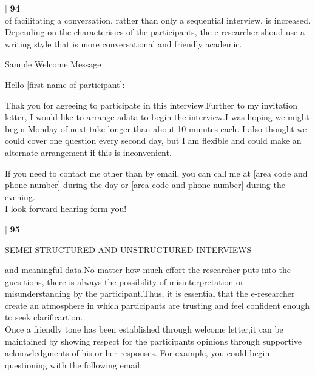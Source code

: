 \documentclass[a4paper]{beamer}
\begin{document}
\begin{frame}
\hspace*{0.1cm}\textbf{$|$}
\hspace*{0.1cm}\textbf{94}\\
of facilitating a conversation, rather than only a sequential interview, is increased. Depending on the characterisics of the participants, the e-researcher shoud use a writing style that is more conversational and friendly academic.
\begin{center}

Sample Welcome Message

\end{center}
Hello [first name of participant]:

 \vspace*{5mm}
 Thak you for agreeing to participate in this interview.Further to my invitation letter, I would like to arrange adata to begin the interview.I was hoping we might begin Monday of next take longer than about 10 minutes each. I also thought we could cover one question every second day, but I am flexible and could make an alternate arrangement if this is inconvenient.
 
 \vspace{5mm}
 If you need to contact me other than by email, you can call me at [area code and phone number] during the day or [area code and phone number] during the evening.\\
 I look forward hearing form you!
\end{frame}
\begin{frame}
\hspace*{0.1cm}\textbf{$|$}
\hspace*{0.1cm}\textbf{95}\\ 
\begin{flushright}
SEMEI-STRUCTURED AND UNSTRUCTURED INTERVIEWS
\end{flushright}
and meaningful data.No matter how much effort the researcher puts into the gues-tions, there is always the possibility of misinterpretation or misunderstanding by the participant.Thus, it is essential that the e-researcher create an atmosphere in which participants are trusting and feel confident enough to seek clarificartion.\\
Once a friendly tone has been established through welcome letter,it can be maintained by showing respect for the participants opinions through supportive acknowledgments of his or her responses. For example, you could begin questioning with the following email:\\
\end{frame}
\end{document}
